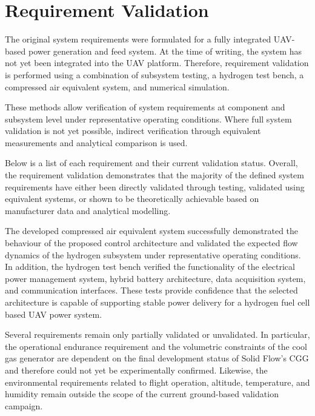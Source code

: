 \section{Requirement Validation}
\label{sec:req validation}

The original system requirements were formulated for a fully integrated UAV-based power generation and feed system. At the time of writing, the system has not yet been integrated into the UAV platform. Therefore, requirement validation is performed using a combination of subsystem testing, a hydrogen test bench, a compressed air equivalent system, and numerical simulation.

These methods allow verification of system requirements at component and subsystem level under representative operating conditions. Where full system validation is not yet possible, indirect verification through equivalent measurements and analytical comparison is used.

Below is a list of each requirement and their current validation status.
Overall, the requirement validation demonstrates that the majority of the defined system requirements have either been directly validated through testing, validated using equivalent systems, or shown to be theoretically achievable based on manufacturer data and analytical modelling.

The developed compressed air equivalent system successfully demonstrated the behaviour of the proposed control architecture and validated the expected flow dynamics of the hydrogen subsystem under representative operating conditions. In addition, the hydrogen test bench verified the functionality of the electrical power management system, hybrid battery architecture, data acquisition system, and communication interfaces. These tests provide confidence that the selected architecture is capable of supporting stable power delivery for a hydrogen fuel cell based UAV power system.

Several requirements remain only partially validated or unvalidated. In particular, the operational endurance requirement and the volumetric constraints of the cool gas generator are dependent on the final development status of Solid Flow’s CGG and therefore could not yet be experimentally confirmed. Likewise, the environmental requirements related to flight operation, altitude, temperature, and humidity remain outside the scope of the current ground-based validation campaign.

